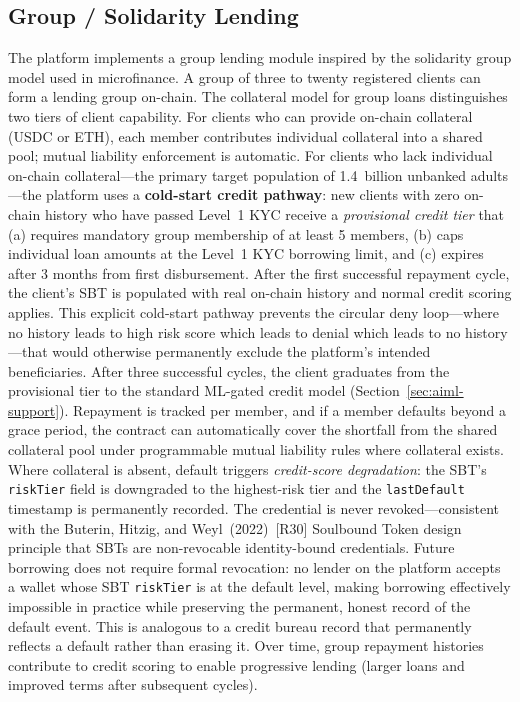 \documentclass[12pt,a4paper]{report}
\begin{document}
\subsection{Group / Solidarity Lending}

The platform implements a group lending module inspired by the solidarity group model used in microfinance. A group of three to twenty registered clients can form a lending group on-chain. The collateral model for group loans distinguishes two tiers of client capability. For clients who can provide on-chain collateral (USDC or ETH), each member contributes individual collateral into a shared pool; mutual liability enforcement is automatic. For clients who lack individual on-chain collateral---the primary target population of 1.4~billion unbanked adults---the platform uses a \textbf{cold-start credit pathway}: new clients with zero on-chain history who have passed Level~1 KYC receive a \textit{provisional credit tier} that (a) requires mandatory group membership of at least 5 members, (b) caps individual loan amounts at the Level~1 KYC borrowing limit, and (c) expires after 3 months from first disbursement. After the first successful repayment cycle, the client's SBT is populated with real on-chain history and normal credit scoring applies. This explicit cold-start pathway prevents the circular deny loop---where no history leads to high risk score which leads to denial which leads to no history---that would otherwise permanently exclude the platform's intended beneficiaries. After three successful cycles, the client graduates from the provisional tier to the standard ML-gated credit model (Section~\ref{sec:aiml-support}). Repayment is tracked per member, and if a member defaults beyond a grace period, the contract can automatically cover the shortfall from the shared collateral pool under programmable mutual liability rules where collateral exists. Where collateral is absent, default triggers \textit{credit-score degradation}: the SBT's \texttt{riskTier} field is downgraded to the highest-risk tier and the \texttt{lastDefault} timestamp is permanently recorded. The credential is never revoked---consistent with the Buterin, Hitzig, and Weyl~(2022)~[R30] Soulbound Token design principle that SBTs are non-revocable identity-bound credentials. Future borrowing does not require formal revocation: no lender on the platform accepts a wallet whose SBT \texttt{riskTier} is at the default level, making borrowing effectively impossible in practice while preserving the permanent, honest record of the default event. This is analogous to a credit bureau record that permanently reflects a default rather than erasing it. Over time, group repayment histories contribute to credit scoring to enable progressive lending (larger loans and improved terms after subsequent cycles).
\end{document}
